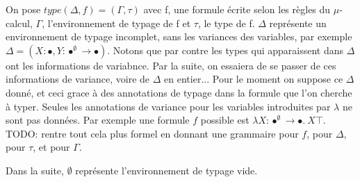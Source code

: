 \documentclass[11pt,a4paper]{article}
\begin{document}
On pose $type(\Delta,f) = (\Gamma, \tau)$ avec f, une formule écrite selon les règles du $\mu$-calcul, $\Gamma$, l'environnement de typage de f et $\tau$, le type de f. $\Delta$ représente un environnement de typage incomplet, sans les variances des variables, par exemple $\Delta=(X:\bullet,Y:\bullet^{\emptyset}\to\bullet)$. Notons que par contre les types qui apparaissent dans $\Delta$ ont les informations de variabnce. Par la suite, on essaiera de se passer de ces informations de variance, voire de $\Delta$ en entier... Pour le moment on suppose ce $\Delta$ donné, et ceci grace à des annotations de typage dans la formule que l'on cherche à typer.
Seules les annotations de variance pour les variables introduites par $\lambda$ ne sont pas données.
Par exemple une formule $f$ possible est $\lambda X:\bullet^{\emptyset}\to\bullet.\ X\top$.
\\
TODO: rentre tout cela plus formel en donnant une grammaire pour $f$, pour $\Delta$, pour $\tau$,
et pour $\Gamma$.


Dans la suite, $\emptyset$ représente l'environnement de typage vide.
\end{document}
